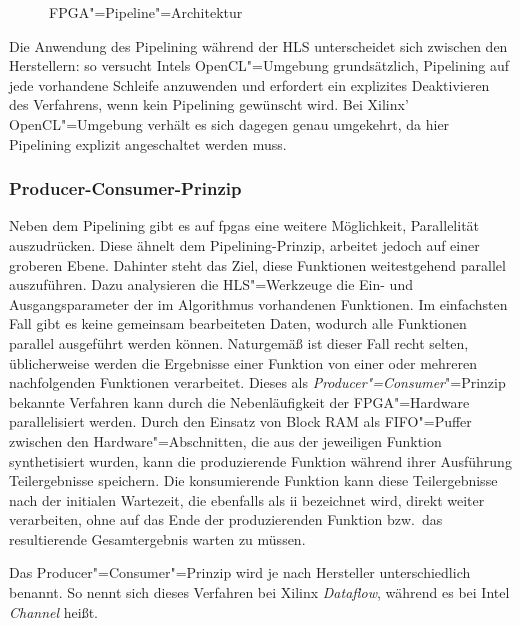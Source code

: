 \begin{figure}[htb]
    \caption{FPGA"=Pipeline"=Architektur \cite[nach][22]{hlsintro2019}}
    \label{fpga:pipelining:pipeline}
\end{figure}

Die Anwendung des Pipelining während der HLS unterscheidet sich zwischen den
Herstellern: so versucht Intels OpenCL"=Umgebung grundsätzlich, Pipelining auf
jede vorhandene Schleife anzuwenden und erfordert ein explizites Deaktivieren
des Verfahrens, wenn kein Pipelining gewünscht wird. Bei Xilinx'
OpenCL"=Umgebung verhält es sich dagegen genau umgekehrt, da hier Pipelining
explizit angeschaltet werden muss.

\subsubsection{Producer-Consumer-Prinzip}

Neben dem Pipelining gibt es auf \gls{fpga}s eine weitere Möglichkeit,
Parallelität auszudrücken. Diese ähnelt dem Pipelining-Prinzip, arbeitet jedoch
auf einer groberen Ebene. Dahinter steht das Ziel, diese Funktionen
weitestgehend parallel auszuführen. Dazu analysieren die HLS"=Werkzeuge die Ein- 
und Ausgangsparameter der im Algorithmus vorhandenen Funktionen. Im einfachsten
Fall gibt es keine gemeinsam bearbeiteten Daten, wodurch alle Funktionen
parallel ausgeführt werden können. Naturgemäß ist dieser Fall recht selten,
üblicherweise werden die Ergebnisse einer Funktion von einer oder mehreren
nachfolgenden Funktionen verarbeitet. Dieses als
\textit{Producer"=Consumer}"=Prinzip bekannte Verfahren kann durch die
Nebenläufigkeit der FPGA"=Hardware parallelisiert werden. Durch den Einsatz von
Block RAM als FIFO"=Puffer zwischen den Hardware"=Abschnitten, die aus der
jeweiligen Funktion synthetisiert wurden, kann die produzierende Funktion
während ihrer Ausführung Teilergebnisse speichern. Die konsumierende Funktion
kann diese Teilergebnisse nach der initialen Wartezeit, die ebenfalls als
\gls{ii} bezeichnet wird, direkt weiter verarbeiten, ohne auf das Ende der
produzierenden Funktion bzw.\ das resultierende Gesamtergebnis warten zu müssen.
\cite[vgl.][22--23]{hlsintro2019}

Das Producer"=Consumer"=Prinzip wird je nach Hersteller unterschiedlich benannt.
So nennt sich dieses Verfahren bei Xilinx \textit{Dataflow}, während es bei
Intel \textit{Channel} heißt.

